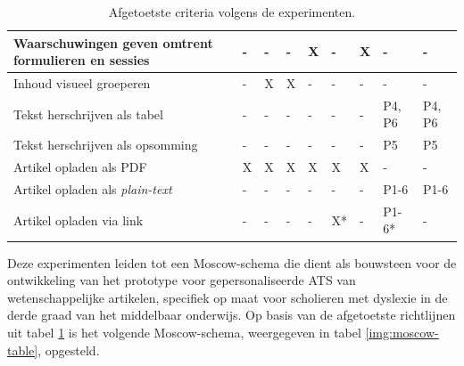 \begin{table}[H]
\begin{tabular}{ | m{8cm} | m{0.5cm} | m{0.5cm} | m{0.5cm} | m{0.5cm} | m{0.5cm} | m{0.5cm} | m{1cm} | m{1cm} | }
		Waarschuwingen geven omtrent formulieren en sessies & - & - & - & X & - & X & - & - \\ \hline
		Inhoud visueel groeperen & - & X & X & - & - & - & - & - \\ \hline
		Tekst herschrijven als tabel & - & - & - & - & - & - & P4, P6 & P4, P6 \\ \hline
		Tekst herschrijven als opsomming & - & - & - & - & - & - & P5 & P5 \\ \hline
		Artikel opladen als PDF & X & X & X & X & X & X & - & - \\ \hline
		Artikel opladen als \textit{plain-text} & - & - & - & - & - & - & P1-6 & P1-6 \\ \hline
		Artikel opladen via link & - & - & - & - & X* & - & P1-6* & - \\ \hline
	\end{tabular}
\label{table:afgetoetste-criteria}
\caption{Afgetoetste criteria volgens de experimenten.}
\end{table}

Deze experimenten leiden tot een Moscow-schema die dient als bouwsteen voor de ontwikkeling van het prototype voor gepersonaliseerde ATS van wetenschappelijke artikelen, specifiek op maat voor scholieren met dyslexie in de derde graad van het middelbaar onderwijs. Op basis van de afgetoetste richtlijnen uit tabel \ref{table:afgetoetste-criteria} is het volgende Moscow-schema, weergegeven in tabel \ref{img:moscow-table}, opgesteld.

